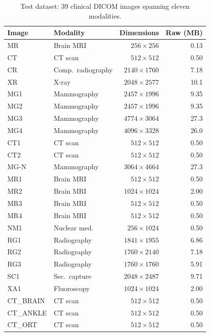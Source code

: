 \documentclass[journal]{IEEEtran}
\begin{document}
\begin{table}[htbp]
\centering
\caption{Test dataset: 39 clinical DICOM images spanning eleven modalities.}
\label{tab:dataset}
\scriptsize
\begin{tabular}{llrr}
\toprule
Image & Modality & Dimensions & Raw (MB) \\
\midrule
MR   & Brain MRI      & $256{\times}256$   & 0.13 \\
CT   & CT scan        & $512{\times}512$   & 0.50 \\
CR   & Comp.\ radiography & $2140{\times}1760$ & 7.18 \\
XR   & X-ray          & $2048{\times}2577$ & 10.1 \\
MG1  & Mammography    & $2457{\times}1996$ & 9.35 \\
MG2  & Mammography    & $2457{\times}1996$ & 9.35 \\
MG3  & Mammography    & $4774{\times}3064$ & 27.3 \\
MG4  & Mammography    & $4096{\times}3328$ & 26.0 \\
CT1  & CT scan        & $512{\times}512$   & 0.50 \\
CT2  & CT scan        & $512{\times}512$   & 0.50 \\
MG-N & Mammography    & $3064{\times}4664$ & 27.3 \\
MR1  & Brain MRI      & $512{\times}512$   & 0.50 \\
MR2  & Brain MRI      & $1024{\times}1024$ & 2.00 \\
MR3  & Brain MRI      & $512{\times}512$   & 0.50 \\
MR4  & Brain MRI      & $512{\times}512$   & 0.50 \\
NM1  & Nuclear med.   & $256{\times}1024$  & 0.50 \\
RG1  & Radiography    & $1841{\times}1955$ & 6.86 \\
RG2  & Radiography    & $1760{\times}2140$ & 7.18 \\
RG3  & Radiography    & $1760{\times}1760$ & 5.91 \\
SC1  & Sec.~capture   & $2048{\times}2487$ & 9.71 \\
XA1  & Fluoroscopy    & $1024{\times}1024$ & 2.00 \\
CT\_BRAIN    & CT scan             & $512{\times}512$   & 0.50 \\
CT\_ANKLE    & CT scan             & $512{\times}512$   & 0.50 \\
CT\_ORT      & CT scan             & $512{\times}512$   & 0.50 \\

\end{tabular}
\end{table}
\end{document}
